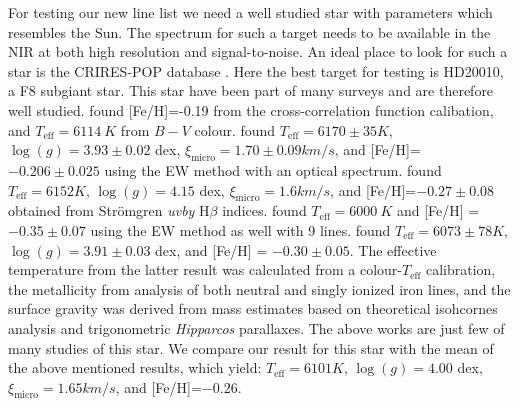 \documentclass{aa}
\begin{document}
For testing our new line list we need a well studied star with
parameters which resembles the Sun. The spectrum for such a target
needs to be available in the NIR at both high resolution and
signal-to-noise. An ideal place to look for such a star is the
CRIRES-POP database \citep{Lebzelter2012}. Here the best target for
testing is HD20010, a F8 subgiant star. This star have been part of
many surveys and are therefore well studied. \cite{Mortier2013} found
[Fe/H]=-0.19 from the cross-correlation function calibation, and
$T_\mathrm{eff}=\SI{6114}{K}$ from $B-V$ colour. \cite{Gonzalez2010}
found $T_\mathrm{eff} = 6170\pm35\si{K}$, $\log(g) = 3.93\pm0.02$ dex,
$\xi_\mathrm{micro} = 1.70\pm0.09\si{km/s}$, and [Fe/H]=$-0.206\pm0.025$
using the EW method with an optical spectrum. \cite{Balachandran1990}
found $T_\mathrm{eff} = 6152\si{K}$, $\log(g) = 4.15$ dex,
$\xi_\mathrm{micro} = 1.6\si{km/s}$, and [Fe/H]=$-0.27\pm0.08$ obtained
from Str\"{o}mgren \emph{uvby} H$\beta$ indices. \cite{Favata199} found
$T_\mathrm{eff}=\SI{6000}{K}$ and [Fe/H] = $-0.35\pm0.07$ using the EW
method as well with 9 lines. \cite{Ramirez2012} found $T_\mathrm{eff}
= 6073\pm78\si{K}$, $\log(g) = 3.91\pm0.03$ dex, and [Fe/H] =
$-0.30\pm0.05$. The effective temperature from the latter result was
calculated from a colour-$T_\mathrm{eff}$ calibration, the metallicity
from analysis of both neutral and singly ionized iron lines, and the
surface gravity was derived from mass estimates based on theoretical
isohcornes analysis and trigonometric \emph{Hipparcos} parallaxes. The
above works are just few of many studies of this star. We compare our
result for this star with the mean of the above mentioned results,
which yield: $T_\mathrm{eff} = 6101\si{K}$, $\log(g) = 4.00$ dex,
$\xi_\mathrm{micro} = 1.65\si{km/s}$, and [Fe/H]=$-0.26$.
\end{document}
